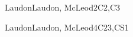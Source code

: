 \begin{syllabus}
\begin{unit}{\SPHistory}{}{LaudonLaudon, McLeod}{2}{C2,C3}
    \begin{topics}
    	\item \SPHistoryTopicPrehistory
        \item \SPHistoryTopicHistory
        \item \SPHistoryTopicPioneers
        \item \SPHistoryTopicHistoryOf
    \end{topics}
    \begin{learningoutcomes}%
        \item \SPHistoryLOIdentifySignificant [\Familiarity]
        \item \SPHistoryLOIdentifyTheSeveral [\Familiarity]
        \item \SPHistoryLODiscussTheForLanguage [\Familiarity]
        \item \SPHistoryLOCompareDaily [\Familiarity]
    \end{learningoutcomes}
\end{unit}

\begin{unit}{\SPSocialContext}{}{LaudonLaudon, McLeod}{4}{C23,CS1}
    \begin{topics}
	    \item \SPSocialContextTopicSocial
	    \item \SPSocialContextTopicImpact
	    \item \SPSocialContextTopicGrowth
	    \item \SPSocialContextTopicOften
	    \item \SPSocialContextTopicAccessibility
	    \item \SPSocialContextTopicContext
    \end{topics}
    \begin{learningoutcomes}%
	    \item \SPSocialContextLODescribePositive[\Familiarity]
	    \item \SPSocialContextLOIdentifyDevelopers[\Usage]
	    \item \SPSocialContextLOInterpretThe[\Assessment]
	    \item \SPSocialContextLOEvaluateTheA [\Familiarity]
	    \item \SPSocialContextLOSummarizeTheSocial [\Familiarity]
	    \item \SPSocialContextLODiscussHowServes [\Familiarity]
	    \item \SPSocialContextLOAnalyzeTheCons [\Familiarity]
	    \item \SPSocialContextLODescribeTheTheOf [\Usage]
	    \item \SPSocialContextLOExplainTheContext [\Familiarity]
    \end{learningoutcomes}
\end{unit}


\end{syllabus}
